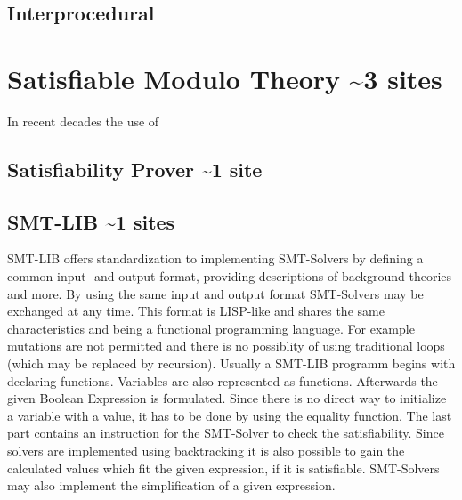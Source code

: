 \subsection{Interprocedural}
\section{Satisfiable Modulo Theory \textasciitilde 3 sites}
In recent decades the use of 
\subsection{Satisfiability Prover \textasciitilde 1 site}
\subsection{SMT-LIB \textasciitilde 1 sites}
SMT-LIB offers standardization to implementing SMT-Solvers by defining a common input- and output format, providing descriptions of background theories and more. %
By using the same input and output format SMT-Solvers may be exchanged at any time. 
This format is LISP-like and shares the same characteristics and being a functional programming language. 
For example mutations are not permitted and there is no possiblity of using traditional loops (which may be replaced by recursion).
Usually a SMT-LIB programm begins with declaring functions. Variables are also represented as functions. 
Afterwards the given Boolean Expression is formulated. Since there is no direct way to initialize a variable with a value, it has to be done by using the equality function. 
The last part contains an instruction for the SMT-Solver to check the satisfiability. 
Since solvers are implemented using backtracking it is also possible to gain the calculated values which fit the given expression, if it is satisfiable. 
SMT-Solvers may also implement the simplification of a given expression.
